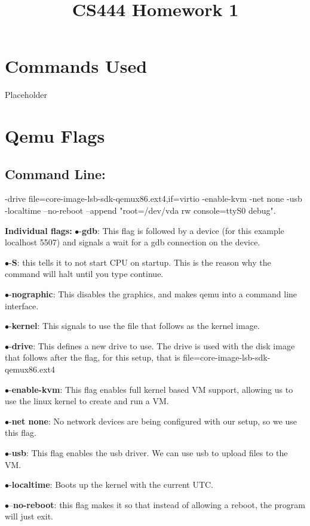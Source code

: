 \documentclass[letterpaper,10pt,fleqn,draftclsnofoot,onecolumn]{IEEEtran}
\title{CS444 Homework 1}
\author{\name}
\begin{document}
	\maketitle
	\hrulefill
	\section*{Commands Used}
	Placeholder
	\section*{Qemu Flags}
	\subsection{Command Line:}
-drive file=core-image-lsb-sdk-qemux86.ext4,if=virtio -enable-kvm -net none -usb -localtime --no-reboot --append "root=/dev/vda rw console=ttyS0 debug".

	{\bf Individual flags:} \newline
	$\bullet$-{\bf gdb}: This flag is followed by a device (for this example localhost 5507) and signals a wait for a gdb connection on the device.
	
	$\bullet$-{\bf S}: this tells it to not start CPU on startup. This is the reason why the command will halt until you type continue.
	
	$\bullet$-{\bf nographic}: This disables the graphics, and makes qemu into a command line interface.
	
	$\bullet$-{\bf kernel}: This signals to use the file that follows as the kernel image. 
	
	$\bullet$-{\bf drive}: This defines a new drive to use. The drive is used with the disk image that follows after the flag, for this setup, that is file=core-image-lsb-sdk-qemux86.ext4
	
	$\bullet$-{\bf enable-kvm}: This flag enables full kernel based VM support, allowing us to use the linux kernel to create and run a VM.
	
	$\bullet$-{\bf net none}: No network devices are being configured with our setup, so we use this flag.
	
	$\bullet$-{\bf usb}: This flag enables the usb driver. We can use usb to upload files to the VM. 
	
	$\bullet$-{\bf localtime}: Boots up the kernel with the current UTC.
	
	$\bullet$--{\bf no-reboot}: this flag makes it so that instead of allowing a reboot, the program will just exit.
	
\end{document}

